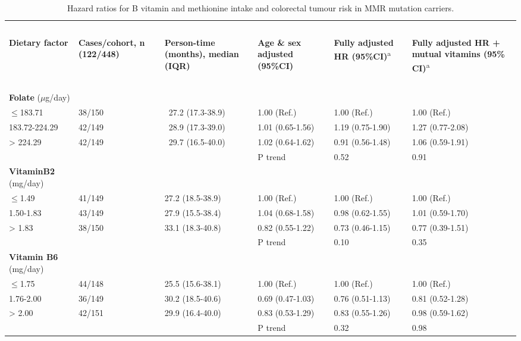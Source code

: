 \begin{sidewaystable}
\caption{Hazard ratios for B vitamin and methionine intake and colorectal tumour risk in MMR mutation carriers.}
\label{table6_2}
\begin{adjustbox}{width=\textwidth}
\begin{tabular}{L{2.7cm}C{2.5cm}C{3.1cm}C{3.1cm}C{3.1cm}C{3.1cm}}
\hline
~ & ~ & ~ & ~ & ~ & ~ \\
\textbf{Dietary factor} & \textbf{Cases/cohort, n (122/448)} & \textbf{Person-time (months), median (IQR)} & \textbf{Age \& sex adjusted (95\%CI)} & \textbf{Fully adjusted HR (95\%CI)}{\textsuperscript{a}} & \textbf{Fully adjusted HR + mutual vitamins (95\% CI)}{\textsuperscript{a}}\\
~ & ~ & ~ & ~ & ~ & ~ \\
\hline
{\textbf{Folate}}{ ($\mu$g/day)} & ~ & ~ & ~ & ~ & ~ \\
{\textrm{${\leq}$}}{183.71} & 38/150 & \ 27.2 (17.3-38.9) & 1.00 (Ref.) & 1.00 (Ref.) & 1.00 (Ref.)\\
183.72-224.29 & 42/149 & \ 28.9 (17.3-39.0) & 1.01 (0.65-1.56) & 1.19 (0.75-1.90) & 1.27 (0.77-2.08)\\
{\textgreater} 224.29 & 42/149 & \ 29.7 (16.5-40.0) & 1.02 (0.64-1.62) & 0.91 (0.56-1.48) & 1.06 (0.59-1.91)\\ ~ & ~ & ~ & P trend & 0.52 & 0.91\\

{\textbf{VitaminB2}}{ (mg/day)} & ~ & ~ & ~ & ~ & ~ \\
{\textrm{${\leq}$}}{1.49} & 41/149 & 27.2 (18.5-38.9) & 1.00 (Ref.) & 1.00 (Ref.) & 1.00 (Ref.)\\
1.50-1.83 & 43/149 & 27.9 (15.5-38.4) & 1.04 (0.68-1.58) & 0.98 (0.62-1.55) & 1.01 (0.59-1.70)\\
{\textgreater} 1.83 & 38/150 & 33.1 (18.3-40.8) & 0.82 (0.55-1.22) & 0.73 (0.46-1.15) & 0.77 (0.39-1.51)\\ ~ & ~ & ~ & P trend & 0.10 & 0.35\\

{\textbf{Vitamin B6}}{ (mg/day)} & ~ & ~ & ~ & ~ & ~ \\
{\textrm{${\leq}$}}{1.75} & 44/148 & 25.5 (15.6-38.1) & 1.00 (Ref.) & 1.00 (Ref.) & 1.00 (Ref.)\\
1.76-2.00 & 36/149 & 30.2 (18.5-40.6) & 0.69 (0.47-1.03) & 0.76 (0.51-1.13) & 0.81 (0.52-1.28)\\
{\textgreater} 2.00 & 42/151 & 29.9 (16.4-40.0) & 0.83 (0.53-1.29) & 0.83 (0.55-1.26) & 0.98 (0.59-1.62)\\ ~ & ~ & ~ & P trend & 0.32 & 0.98\\
\hline
\end{tabular}
\end{adjustbox}
\end{sidewaystable}

